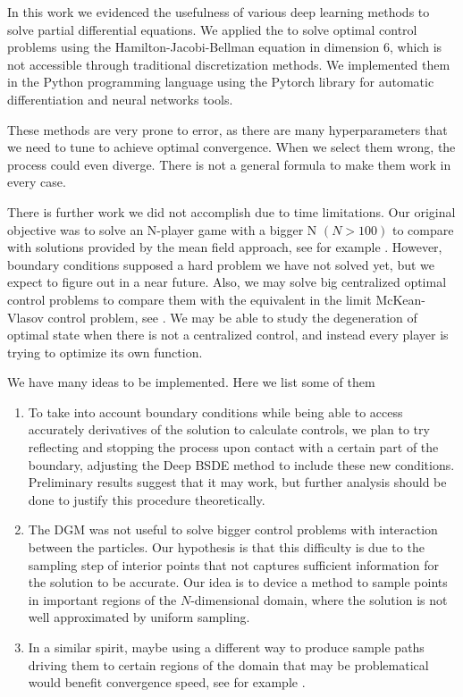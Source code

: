In this work we evidenced the usefulness of various deep learning methods to solve partial differential equations. We applied the to solve optimal control problems using the Hamilton-Jacobi-Bellman equation in dimension 6, which is not accessible through traditional discretization methods. We implemented them in the Python programming language using the Pytorch library for automatic differentiation and neural networks tools.

These methods are very prone to error, as there are many hyperparameters that we need to tune to achieve optimal convergence. When we select them wrong, the process could even diverge. There is not a general formula to make them work in every case.

There is further work we did not accomplish due to time limitations. Our original objective was to solve an N-player game with a bigger N $(N>100)$ to compare with solutions provided by the mean field approach, see for example \cite{achdou_mean_2020}. However, boundary conditions supposed a hard problem we have not solved yet, but we expect to figure out in a near future. Also, we may solve big centralized optimal control problems to compare them with the equivalent in the limit McKean-Vlasov control problem, see \cite{carmona_control_2013}. We may be able to study the degeneration of optimal state when there is not a centralized control, and instead every player is trying to optimize its own function.

We have many ideas to be implemented. Here we list some of them 
\begin{enumerate}
	\item To take into account boundary conditions while being able to access accurately derivatives of the solution to calculate controls, we plan to try reflecting and stopping the process upon contact with a certain part of the boundary, adjusting the Deep BSDE method to include these new conditions. Preliminary results suggest that it may work, but further analysis should be done to justify this procedure theoretically.
	\item The DGM was not useful to solve bigger control problems with interaction between the particles. Our hypothesis is that this difficulty is due to the sampling step of interior points that not captures sufficient information for the solution to be accurate. Our idea is to device a method to sample points in important regions of the $N$-dimensional domain, where the solution is not well approximated by uniform sampling.
	\item In a similar spirit, maybe using a different way to produce sample paths driving them to certain regions of the domain that may be problematical would benefit convergence speed, see for example \cite{nusken_solving_2023}. 
\end{enumerate}    